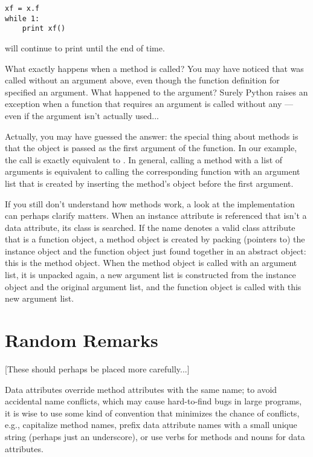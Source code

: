 \documentclass{manual}
\begin{document}
\begin{verbatim}
xf = x.f
while 1:
    print xf()
\end{verbatim}

will continue to print  until the end of time.

What exactly happens when a method is called?  You may have noticed
that  was called without an argument above, even though
the function definition for  specified an argument.  What
happened to the argument?  Surely Python raises an exception when a
function that requires an argument is called without any --- even if
the argument isn't actually used...

Actually, you may have guessed the answer: the special thing about
methods is that the object is passed as the first argument of the
function.  In our example, the call  is exactly equivalent
to .  In general, calling a method with a list of
 arguments is equivalent to calling the corresponding function
with an argument list that is created by inserting the method's object
before the first argument.

If you still don't understand how methods work, a look at the
implementation can perhaps clarify matters.  When an instance
attribute is referenced that isn't a data attribute, its class is
searched.  If the name denotes a valid class attribute that is a
function object, a method object is created by packing (pointers to)
the instance object and the function object just found together in an
abstract object: this is the method object.  When the method object is
called with an argument list, it is unpacked again, a new argument
list is constructed from the instance object and the original argument
list, and the function object is called with this new argument list.


\section{Random Remarks \label{remarks}}

[These should perhaps be placed more carefully...]


Data attributes override method attributes with the same name; to
avoid accidental name conflicts, which may cause hard-to-find bugs in
large programs, it is wise to use some kind of convention that
minimizes the chance of conflicts, e.g., capitalize method names,
prefix data attribute names with a small unique string (perhaps just
an underscore), or use verbs for methods and nouns for data attributes.
\end{document}

